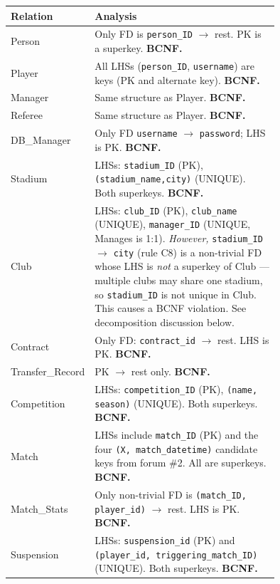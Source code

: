 \documentclass[11pt]{article}
\begin{document}
\begin{longtable}{@{}lp{0.75\linewidth}@{}}
\toprule
\textbf{Relation} & \textbf{Analysis} \\
\midrule\endhead

Person & Only FD is \texttt{person\_ID} $\to$ rest. PK is a superkey. \textbf{BCNF.} \\[2pt]

Player  & All LHSs (\texttt{person\_ID}, \texttt{username}) are
  keys (PK and alternate key). \textbf{BCNF.} \\[2pt]

Manager & Same structure as Player. \textbf{BCNF.} \\[2pt]

Referee & Same structure as Player. \textbf{BCNF.} \\[2pt]

DB\_Manager & Only FD \texttt{username} $\to$ \texttt{password}; LHS is PK.
  \textbf{BCNF.} \\[2pt]

Stadium & LHSs: \texttt{stadium\_ID} (PK), \texttt{(stadium\_name,city)}
  (UNIQUE). Both superkeys. \textbf{BCNF.} \\[2pt]

Club & LHSs: \texttt{club\_ID} (PK), \texttt{club\_name} (UNIQUE),
  \texttt{manager\_ID} (UNIQUE, Manages is 1:1). \emph{However,}
  \texttt{stadium\_ID} $\to$ \texttt{city} (rule C8) is a non-trivial FD
  whose LHS is \emph{not} a superkey of Club --- multiple clubs may share
  one stadium, so \texttt{stadium\_ID} is not unique in Club. This causes
  a BCNF violation. See decomposition discussion below. \\[2pt]

Contract & Only FD: \texttt{contract\_id} $\to$ rest. LHS is PK.
  \textbf{BCNF.} \\[2pt]

Transfer\_Record & PK $\to$ rest only. \textbf{BCNF.} \\[2pt]

Competition & LHSs: \texttt{competition\_ID} (PK),
  \texttt{(name, season)} (UNIQUE). Both superkeys. \textbf{BCNF.} \\[2pt]

Match & LHSs include \texttt{match\_ID} (PK) and the four
  \texttt{(X, match\_datetime)} candidate keys from forum \#2. All are
  superkeys. \textbf{BCNF.} \\[2pt]

Match\_Stats & Only non-trivial FD is
  \texttt{(match\_ID, player\_id)} $\to$ rest. LHS is PK. \textbf{BCNF.}
  \\[2pt]

Suspension & LHSs: \texttt{suspension\_id} (PK) and
  \texttt{(player\_id, triggering\_match\_ID)} (UNIQUE). Both superkeys.
  \textbf{BCNF.} \\

\bottomrule
\end{longtable}
\end{document}
